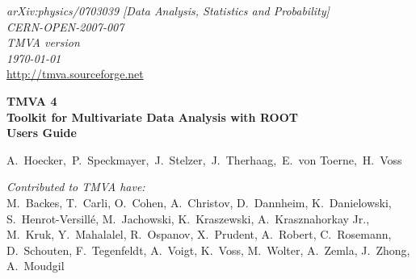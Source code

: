\vspace{-1cm}
\begin{flushright}
{\sf\em arXiv:physics/0703039 [Data Analysis, Statistics and Probability]} \\
{\sf\em CERN-OPEN-2007-007} \\
{\sf\em TMVA version \TMVAVersion} \\
{\sf\em \today} \\
\def\UrlFont{\sf\em}
\url{http://tmva.sourceforge.net} 
\end{flushright}
\def\UrlFont{\rm}

\def\miniPageOffset{0.2cm}
\def\miniPageWidth{13.5cm}
\HRule
\begin{flushleft}
\hspace{\miniPageOffset}\begin{minipage}{\miniPageWidth}
{\sf\Huge\bfseries\boldmath TMVA 4} \\[0.2cm]
{\sf\Large\bfseries\boldmath Toolkit for Multivariate Data Analysis with ROOT} \\[1cm]
{\sf\Huge\bfseries\boldmath Users Guide} 
\end{minipage}
\end{flushleft}
\HRule
\vspace{2.0cm}
\begin{flushright}
{\sf\Large  A.~Hoecker,~P.~Speckmayer,~J.~Stelzer,~J.~Therhaag,~E.~von Toerne,~H.~Voss} 

\vspace{1.2cm}
{\sf\em\large Contributed to TMVA have:} \\[0.4cm]
{\sf\large 
M.~Backes,
T.~Carli,
O.~Cohen,
A.~Christov, 
D.~Dannheim,
K.~Danielowski,\\[0.1cm]
S.~Henrot-Versill\'e, 
M.~Jachowski, 
K.~Kraszewski,
A.~Krasznahorkay Jr.,  \\[0.1cm]    
M.~Kruk,
Y.~Mahalalel, 
R.~Ospanov, 
X.~Prudent, 
A.~Robert,
C.~Rosemann, \\[0.1cm]  
D.~Schouten, 
F.~Tegenfeldt,
A.~Voigt,
K.~Voss,
M.~Wolter, 
A.~Zemla,
J.~Zhong,
A.~Moudgil
}

\end{flushright}

